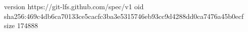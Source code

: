 version https://git-lfs.github.com/spec/v1
oid sha256:469c4db6ca70133ce5cacfc3ba3e5315746eb93cc9d4288dd0ca7476a45b0ecf
size 174888
